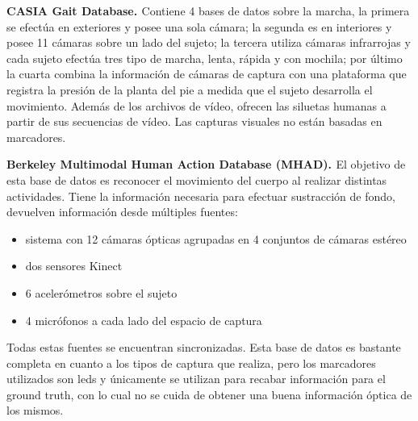 \textbf{CASIA Gait Database. \cite{CASIA}}
Contiene 4 bases de datos sobre la marcha, la primera se efectúa en exteriores y posee una sola cámara; la segunda es en interiores  y posee 11 cámaras sobre un lado del sujeto; la tercera utiliza cámaras infrarrojas y cada sujeto efectúa tres tipo de marcha, lenta, rápida y con mochila; por último la cuarta combina la información de cámaras de captura con una plataforma que registra la presión de la planta del pie a medida que el sujeto desarrolla el movimiento. Además de los archivos de vídeo, ofrecen las siluetas humanas a partir de sus secuencias de vídeo. Las capturas visuales no están basadas en marcadores.

\textbf{Berkeley Multimodal Human Action Database (MHAD). \cite{MHAD}}
El objetivo de esta base de datos es reconocer el movimiento del cuerpo al realizar distintas actividades. Tiene la información necesaria para efectuar sustracción de fondo, devuelven información desde múltiples fuentes:
\begin{itemize}
\item sistema con 12 cámaras ópticas agrupadas en 4 conjuntos de cámaras estéreo
\item dos sensores Kinect
\item 6 acelerómetros sobre el sujeto
\item 4 micrófonos a cada lado del espacio de captura
\end{itemize} Todas estas fuentes se encuentran sincronizadas. Esta base de datos es bastante completa en cuanto a los tipos de captura que realiza, pero los marcadores utilizados son leds y únicamente se utilizan para recabar información para el ground truth, con lo cual no se cuida de obtener una buena información óptica de los mismos. 



